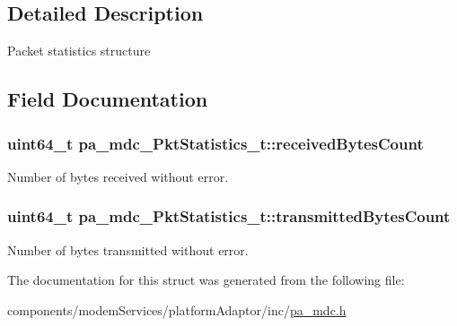 \subsection{Detailed Description}
Packet statistics structure 

\subsection{Field Documentation}
\subsubsection[{\texorpdfstring{received\+Bytes\+Count}{receivedBytesCount}}]{\setlength{\rightskip}{0pt plus 5cm}uint64\+\_\+t pa\+\_\+mdc\+\_\+\+Pkt\+Statistics\+\_\+t\+::received\+Bytes\+Count}\hypertarget{structpa__mdc___pkt_statistics__t_a7ca7d816486c7c6ba12087fcc7c3c284}{}\label{structpa__mdc___pkt_statistics__t_a7ca7d816486c7c6ba12087fcc7c3c284}


Number of bytes received without error. 

\subsubsection[{\texorpdfstring{transmitted\+Bytes\+Count}{transmittedBytesCount}}]{\setlength{\rightskip}{0pt plus 5cm}uint64\+\_\+t pa\+\_\+mdc\+\_\+\+Pkt\+Statistics\+\_\+t\+::transmitted\+Bytes\+Count}\hypertarget{structpa__mdc___pkt_statistics__t_aaf16be86f6d023de1e9a85089f0974d8}{}\label{structpa__mdc___pkt_statistics__t_aaf16be86f6d023de1e9a85089f0974d8}


Number of bytes transmitted without error. 



The documentation for this struct was generated from the following file\+:\begin{DoxyCompactItemize}
\item 
components/modem\+Services/platform\+Adaptor/inc/\hyperlink{pa__mdc_8h}{pa\+\_\+mdc.\+h}\end{DoxyCompactItemize}

